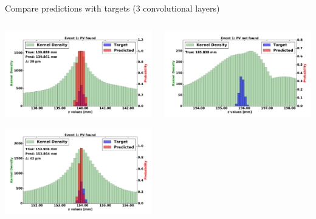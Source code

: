 \begin{frame}{Compare predictions with targets (3 convolutional layers)}
  \begin{columns}[c]
        \begin{center}
            \includegraphics[width=1\textwidth,height=0.45\textwidth, trim=18 0 18 0]{images/120000_3layer_08.pdf}

            \includegraphics[width=1\textwidth, height=0.45\textwidth,trim=18 0 18 0]{images/120000_3layer_09.pdf}

        \end{center}
        \begin{center}
           \includegraphics[width=1\textwidth, height=0.45\textwidth, trim=18 0 18 0]{images/120000_3layer_10.pdf}


\end{center}
\end{columns}
\end{frame}
